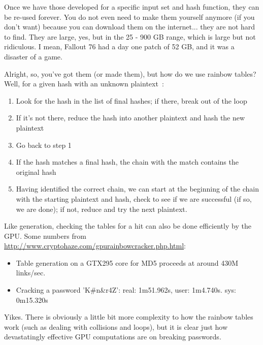\documentclass[a4paper]{report}
\begin{document}
Once we have those developed for a specific input set and hash function, they can be re-used forever. You do not even need to make them yourself anymore (if you don't want) because you can download them on the internet... they are not hard to find. They are large, yes, but in the 25 - 900 GB range, which is large  but not ridiculous. I mean, Fallout 76 had a day one patch of 52 GB, and it was a disaster of a game.

Alright, so, you've got them (or made them), but how do we use rainbow tables? Well, for a given hash with an unknown plaintext~\cite{rainbowtables}:
\begin{enumerate}
	\item Look for the hash in the list of final hashes; if there, break out of the loop
	\item If it's not there, reduce the hash into another plaintext and hash the new plaintext
	\item Go back to step 1
	\item If the hash matches a final hash, the chain with the match contains the original hash
	\item Having identified the correct chain, we can start at the beginning of the chain with the starting plaintext and hash, check to see if we are successful (if so, we are done); if not, reduce and try the next plaintext. 
\end{enumerate} 

Like generation, checking the tables for a hit can also be done efficiently by the GPU. Some numbers from \url{http://www.cryptohaze.com/gpurainbowcracker.php.html}: 
\begin{itemize}
	\item Table generation on a GTX295 core for MD5 proceeds at around 430M links/sec.
	\item Cracking a password 'K\#n\&r4Z': real: 1m51.962s, user: 1m4.740s. sys: 0m15.320s
\end{itemize}

Yikes. There is obviously a little bit more complexity to how the rainbow tables work (such as dealing with collisions and loops), but it is clear just how devastatingly effective GPU computations are on breaking passwords.
\end{document}
